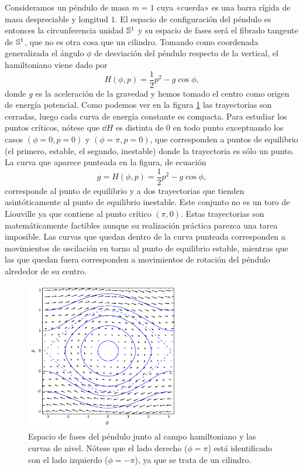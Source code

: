   Consideramos un péndulo de masa $m=1$ cuya «cuerda» es una barra rígida de masa despreciable y longitud $1$. El espacio de configuración del péndulo es entonces la circunferencia unidad $\mathbb{S}^1$ y su espacio de fases será el fibrado tangente de $\mathbb{S}^1$, que no es otra cosa que un cilindro. Tomando como coordenada generalizada el ángulo $\phi$ de desviación del péndulo respecto de la vertical, el hamiltoniano viene dado por 
  \begin{equation*}
    H(\phi,p)=\frac{1}{2}p^2 - g\cos\phi,
  \end{equation*}
  donde $g$ es la aceleración de la gravedad y hemos tomado el centro como origen de energía potencial.
  Como podemos ver en la figura \ref{fig:pendulo}  las trayectorias son cerradas, luego cada curva de energía constante es compacta. Para estudiar los puntos críticos, nótese que $\dd H$ es distinta de 0 en todo punto exceptuando los casos $(\phi=0,p=0)$ y $(\phi=\pi,p=0)$, que corresponden a puntos de equilibrio (el primero, estable, el segundo, inestable) donde la trayectoria es sólo un punto. La curva que aparece punteada en la figura, de ecuación
  \begin{equation*}
    g=H(\phi,p)=\frac{1}{2}p^2 - g \cos\phi ,
  \end{equation*}
   corresponde al punto de equilibrio y a dos trayectorias que tienden asintóticamente al punto de equilibrio inestable. Este conjunto no es un toro de Liouville ya que contiene al punto crítico $(\pi,0)$. Estas trayectorias son matemáticamente factibles aunque su realización práctica parezca una tarea imposible. Las curvas que quedan dentro de la curva punteada corresponden a movimientos de oscilación en torno al punto de equilibrio estable, mientras que las que quedan fuera corresponden a movimientos de rotación del péndulo alrededor de su centro. 
  \begin{figure}[h]
    \centering
    \includegraphics[width=0.6\textwidth]{pics/pendulo}
    \caption{\small Espacio de fases del péndulo junto al campo hamiltoniano y las curvas de nivel. Nótese que el lado derecho ($\phi=\pi$) está identificado con el lado izquierdo ($\phi=-\pi$), ya que se trata de un cilindro.}
    \label{fig:pendulo}
  \end{figure}

